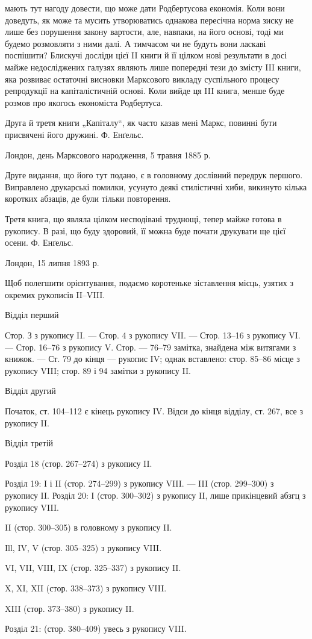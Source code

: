 \parcont{}  %
мають тут нагоду довести, що може дати Родбертусова економія. Коли
вони доведуть, як може та мусить утворюватись однакова пересічна
норма зиску не лише без порушення закону вартости, але, навпаки, на
його основі, тоді ми будемо розмовляти з ними далі. А тимчасом чи не
будуть вони ласкаві поспішити? Блискучі досліди цієї II книги й її цілком
нові результати в досі майже недосліджених галузях являють лише
попередні тези до змісту III книги, яка розвиває остаточні висновки Марксового
викладу суспільного процесу репродукції на капіталістичній
основі. Коли вийде ця III книга, менше буде розмов про якогось економіста
Родбертуса.

Друга й третя книги „Капіталу“, як часто казав мені Маркс, повинні
бути присвячені його дружині.
Ф. Енґельс.

Лондон, день Марксового народження, 5 травня 1885 р.

Друге видання, що його тут подано, є в головному дослівний передрук
першого. Виправлено друкарські помилки, усунуто деякі стилістичні
хиби, викинуто кілька коротких абзаців, де були тільки повторення.

Третя книга, що являла цілком несподівані труднощі, тепер майже
готова в рукопису. В разі, що буду здоровий, її можна буде почати
друкувати ще цієї осени. Ф. Енґельс.

Лондон, 15 липня 1893 р.

Щоб полегшити орієнтування, подаємо коротеньке зіставлення місць,
узятих з окремих рукописів II--VIII.

Відділ перший

Стор. З з рукопису II. — Стор. 4 з рукопису VII. — Стор. 13--16
з рукопису VI. — Стор. 16--76 з рукопису V. Стор. — 76--79 замітка, знайдена
між витягами з книжок. — Ст. 79 до кінця — рукопис IV; однак
вставлено: стор. 85--86 місце з рукопису VIII; стор. 89 і 94 замітки з
рукопису II.

Відділ другий

Початок, ст. 104--112 є кінець рукопису IV. Відси до кінця відділу,
ст. 267, все з рукопису II.

Відділ третій

Розділ 18 (стор. 267--274) з рукопису II.

Розділ 19: I і II (стор. 274--299) з рукопису VIII. — III (стор. 299--300)
з рукопису II.
Розділ 20: І (стор. 300--302) з рукопису II, лише прикінцевий
абзгц з рукопису VIII.

II (стор. 300--305) в головному з рукопису II.

Ill, IV, V (стор. 305--325) з рукопису VIII.

VI, VII, VIII, IX (стор. 325--337) з рукопису II.

X, XI, XII (стор. 338--373) з рукопису VIII.

XIII (стор. 373--380) з рукопису II.

Розділ 21: (стор. 380--409) увесь з рукопису VIII.
\parbreak{}  %
